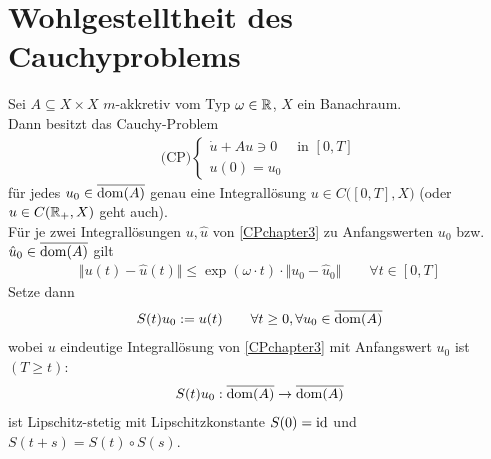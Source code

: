 
\chapter{Wohlgestelltheit des Cauchyproblems} %
\setcounter{section}{1}
\begin{theorem}\label{theoremCrandall-Liggett}\enter
	Sei $A\subseteq X\times X$ $m$-akkretiv vom Typ $\omega\in\mathbb{R}$, $X$ ein Banachraum.\\
	Dann besitzt das Cauchy-Problem
	\begin{align}\label{CPchapter3}\tag{CP}
		\text{(CP)}\left\lbrace\begin{array}{rl}
			\dot{u}+Au\ni 0&\text{ in }[0,T]\\
			u(0)=u_0&
		\end{array}\right.
	\end{align}
	für jedes $u_0\in\overline{\operatorname{dom}(A)}$ genau eine Integrallösung $u\in C\big([0,T],X\big)$ (oder $u\in C(\mathbb{R}_+,X)$ geht auch).\\
	Für je zwei Integrallösungen $u,\hat{u}$ von \eqref{CPchapter3} zu Anfangswerten $u_0$ bzw. $\hat{u}_0\in\overline{\operatorname{dom}(A)}$ gilt
	\begin{align*}
		\big\Vert u(t)-\hat{u}(t)\big\Vert
		\leq\exp(\omega\cdot t)\cdot\big\Vert u_0-\hat{u}_0\big\Vert\qquad\forall t\in[0,T]
	\end{align*}
	Setze dann
	\begin{align*}
		S(t)u_0:=u(t)\qquad\forall t\geq0,\forall u_0\in\overline{\operatorname{dom}(A)}
	\end{align*}
	wobei $u$ eindeutige Integrallösung von \eqref{CPchapter3} mit Anfangswert $u_0$ ist $(T\geq t)$:
	\begin{align*}
		S(t)u_0:\overline{\operatorname{dom}(A)}\to\overline{\operatorname{dom}(A)}
	\end{align*}
	ist Lipschitz-stetig mit Lipschitzkonstante $S(0)=\operatorname{id}$ und $S(t+s)=S(t)\circ S(s)$.
\end{theorem}


